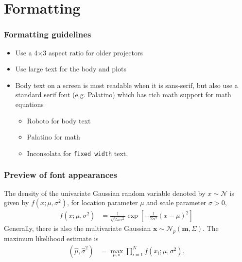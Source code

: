 \section{Formatting}


\begin{frame}
  \frametitle{Formatting guidelines}
    \begin{itemize}
    \item Use a 4$\times$3 aspect ratio for older projectors
    \item Use \large{large} \normalsize text for the body and plots
  \item Body text on a screen is most readable when it is sans-serif,
    but also use a standard serif font (e.g. Palatino) which has rich
    math support for math equations
    \begin{itemize}
    \item Roboto for body text
    \item Palatino for math
    \item Inconsolata for \texttt{fixed width} text.
    \end{itemize}
  \end{itemize}
\end{frame}


\begin{frame}
  \frametitle{Preview of font appearances}

  The density of the univariate Gaussian random variable denoted by
  $x \sim \mathcal{N}$ is given by $f(x; \mu, \sigma^2)$, for location
  parameter $\mu$ and scale parameter $\sigma > 0$,
%
  \begin{align*}
    f(x; \mu, \sigma^2) &= \frac{1}{\sqrt{2\pi\sigma^2}} \exp 
           \left[
           -\frac{1}{2\sigma^2}(x - \mu)^2
           \right]
  \end{align*}
%
  Generally, there is also the multivariate Gaussian
  $\mathbf{x} \sim \mathcal{N}_p(\mathbf{m}, \Sigma)$. The maximum
  likelihood estimate is
  \begin{align*}
    (\hat{\mu}, \hat{\sigma}^2) &= \max_{\mu, \sigma} \prod_{i=1}^N f(x_i; \mu, \sigma^2).
  \end{align*}
  
\end{frame}



